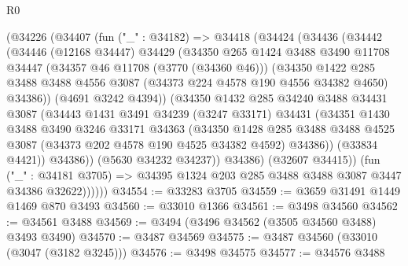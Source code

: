 \begin{lexlean}{R0}
\begin{coremodule}
          (@34226
            (@34407
              (fun ("_" : @34182) =>
              @34418
                (@34424
                  (@34436
                    (@34442
                      (@34446
                        (@12168 @34447)
                        @34429
                        (@34350
                          @265
                          @1424
                          @3488
                          @3490
                          @11708
                          @34447
                          (@34357 @46 @11708 (@3770 (@34360 @46)))
                          (@34350
                            @1422
                            @285
                            @3488
                            @3488
                            @4556
                            @3087
                            (@34373 @224 @4578 @190 @4556 @34382 @4650)
                            @34386))
                        (@4691 @3242 @4394))
                      (@34350
                        @1432
                        @285
                        @34240
                        @3488
                        @34431
                        @3087
                        (@34443
                          @1431
                          @3491
                          @34239
                          (@3247 @33171)
                          @34431
                          (@34351
                            @1430
                            @3488
                            @3490
                            @3246
                            @33171
                            @34363
                            (@34350
                              @1428
                              @285
                              @3488
                              @3488
                              @4525
                              @3087
                              (@34373 @202 @4578 @190 @4525 @34382 @4592)
                              @34386))
                          (@33834 @4421))
                        @34386))
                    (@5630 @34232 @34237))
                  @34386)
                (@32607 @34415))
              (fun ("_" : @34181 @3705) =>
              @34395 @1324 @203 @285 @3488 @3488 @3087 @3447 @34386 @32622))))))
@34554 := @33283 @3705
@34559 := @3659 @31491 @1449 @1469 @870 @3493
@34560 := @33010 @1366
@34561 := @3498 @34560
@34562 := @34561 @3488
@34569 := @3494 (@3496 @34562 (@3505 @34560 @3488) @3493 @3490)
@34570 := @3487 @34569
@34575 := @3487 @34560 (@33010 (@3047 (@3182 @3245)))
@34576 := @3498 @34575
@34577 := @34576 @3488

\end{coremodule}
\end{lexlean}
